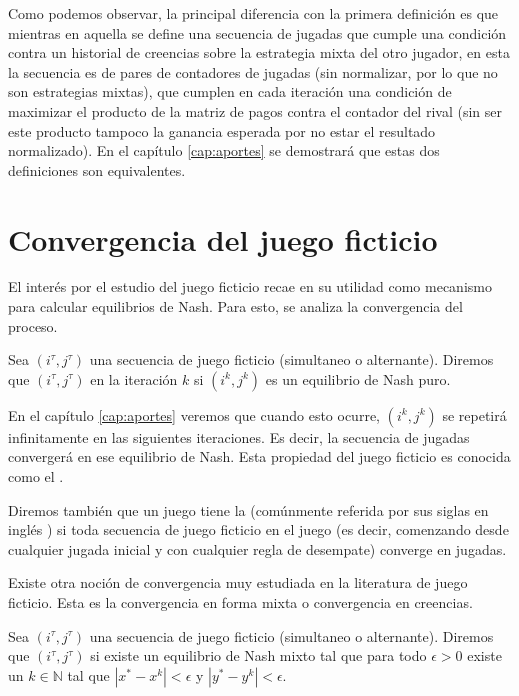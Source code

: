 Como podemos observar, la principal diferencia con la primera definición es que mientras en aquella se define una secuencia de jugadas que cumple una condición contra un historial de creencias sobre la estrategia mixta del otro jugador, en esta la secuencia es de pares de contadores de jugadas (sin normalizar, por lo que no son estrategias mixtas), que cumplen en cada iteración una condición de maximizar el producto de la matriz de pagos contra el contador del rival (sin ser este producto tampoco la ganancia esperada por no estar el resultado normalizado). En el capítulo \ref{cap:aportes} se demostrará que estas dos definiciones son equivalentes.

\section{Convergencia del juego ficticio}

El interés por el estudio del juego ficticio recae en su utilidad como mecanismo para calcular equilibrios de Nash. Para esto, se analiza la convergencia del proceso.

\begin{definition}

    Sea $(i^\tau, j^\tau)$ una secuencia de juego ficticio (simultaneo o alternante). Diremos que $(i^\tau, j^\tau)$  en la iteración $k$ si $(i^k, j^k)$ es un equilibrio de Nash puro.

\end{definition}

En el capítulo \ref{cap:aportes} veremos que cuando esto ocurre, $(i^k, j^k)$ se repetirá infinitamente en las siguientes iteraciones. Es decir, la secuencia de jugadas convergerá en ese equilibrio de Nash. Esta propiedad del juego ficticio es conocida como el .

Diremos también que un juego tiene la  (comúnmente referida por sus siglas en inglés ) si toda secuencia de juego ficticio en el juego (es decir, comenzando desde cualquier jugada inicial y con cualquier regla de desempate) converge en jugadas.

Existe otra noción de convergencia muy estudiada en la literatura de juego ficticio. Esta es la convergencia en forma mixta o convergencia en creencias.

\begin{definition}
    Sea $(i^\tau, j^\tau)$ una secuencia de juego ficticio (simultaneo o alternante). Diremos que $(i^\tau, j^\tau)$  si existe un equilibrio de Nash mixto tal que para todo $\epsilon > 0$ existe un $k \in \mathbb{N}$ tal que $|x^* - x^k| < \epsilon$ y $|y^* - y^k| < \epsilon$.
\end{definition}

